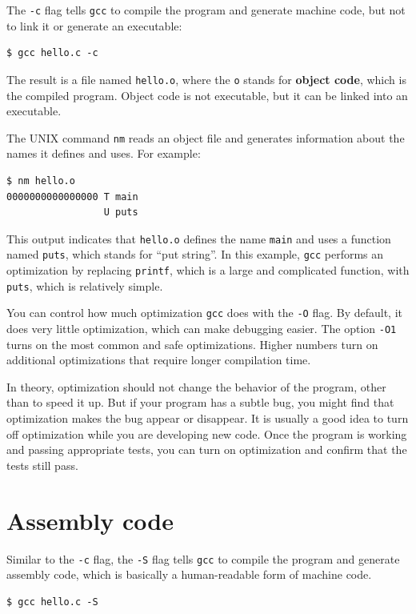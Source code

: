 \documentclass[12pt]{book}
\begin{document}
{The {\tt -c} flag tells {\tt gcc} to compile the program and
generate machine code, but not to link it or generate an executable:

\begin{verbatim}
$ gcc hello.c -c
\end{verbatim}

The result is a file named {\tt hello.o}, where the {\tt o} stands for
{\bf object code}, which is the compiled program.  Object code is not
executable, but it can be linked into an executable.

The UNIX command {\tt nm} reads an object file and generates
information about the names it defines and uses.  For example:

\begin{verbatim}
$ nm hello.o
0000000000000000 T main
                 U puts
\end{verbatim}

This output indicates that {\tt hello.o} defines the name {\tt main}
and uses a function named {\tt puts}, which stands for ``put string''.
In this example, {\tt gcc} performs an optimization by replacing
{\tt printf}, which is a large and complicated function, with
{\tt puts}, which is relatively simple.

You can control how much optimization {\tt gcc} does with
the {\tt -O} flag.  By default, it does very little optimization, which
can make debugging easier.  The option {\tt -O1} turns on the most
common and safe optimizations.  Higher numbers turn on additional
optimizations that require longer compilation time.

In theory, optimization should not change the behavior of the program,
other than to speed it up.  But if your program has a subtle bug,
you might find that optimization makes the bug appear or disappear.
It is usually a good idea to turn off optimization while you are developing
new code.  Once the program is working and passing appropriate tests,
you can turn on optimization and confirm that the tests still pass.


\section{Assembly code}

Similar to the {\tt -c} flag, the {\tt -S} flag tells {\tt gcc}
to compile the program and generate assembly code, which is basically
a human-readable form of machine code.

\begin{verbatim}
$ gcc hello.c -S
\end{verbatim}

}
\end{document}
